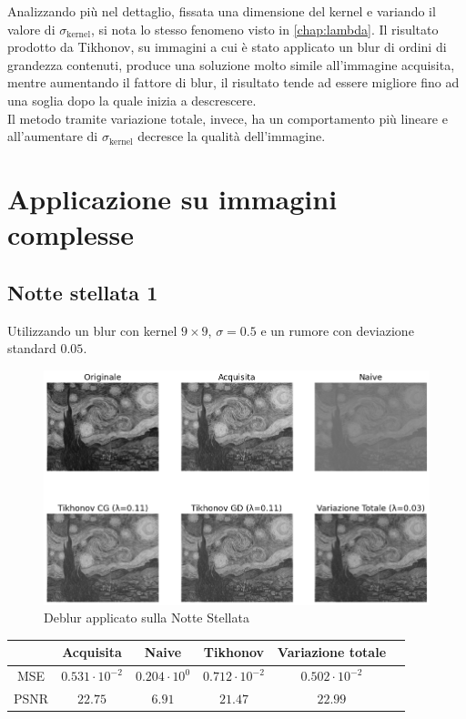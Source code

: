 \documentclass[11pt]{article}
\begin{document}
Analizzando più nel dettaglio, fissata una dimensione del kernel e variando il valore di $\sigma_{\text{kernel}}$, si nota lo stesso fenomeno visto in \autoref{chap:lambda}. 
Il risultato prodotto da Tikhonov, su immagini a cui è stato applicato un blur di ordini di grandezza contenuti, produce una soluzione molto simile all'immagine acquisita, 
mentre aumentando il fattore di blur, il risultato tende ad essere migliore fino ad una soglia dopo la quale inizia a descrescere.\\
Il metodo tramite variazione totale, invece, ha un comportamento più lineare e all'aumentare di $\sigma_{\text{kernel}}$ decresce la qualità dell'immagine.

\section{Applicazione su immagini complesse}
\subsection{Notte stellata 1}
Utilizzando un blur con kernel $9 \times 9$, $\sigma=0.5$ e un rumore con deviazione standard $0.05$.
\begin{figure}[H]
    \centering
    \includegraphics[width=12cm]{reale/1/1/deblur.png}
    \caption{Deblur applicato sulla Notte Stellata}
    \label{fig:deblur_reale1_1}
\end{figure}
\begin{center}
    \begin{tabular}{ |c|c|c|c|c|c| }
    \hline
    & Acquisita & Naive & Tikhonov & Variazione totale \\ 
    \hline
    MSE & $0.531 \cdot 10^{-2}$ & $0.204 \cdot 10^{0}$ & $0.712 \cdot 10^{-2}$ & $0.502 \cdot 10^{-2}$ \\ 
    PSNR & $22.75$ & $6.91$ & $21.47$ & $22.99$ \\ 
    \hline
    \end{tabular}
\end{center}
\end{document}
